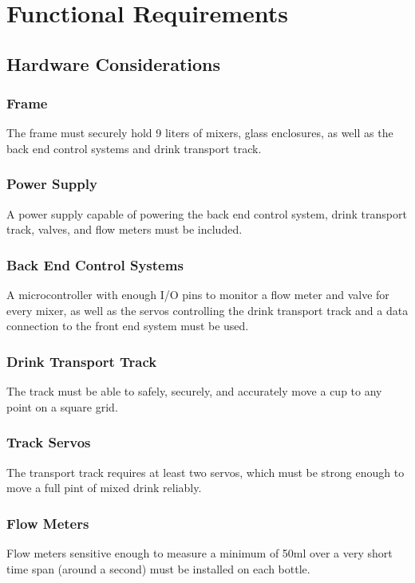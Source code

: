 
\chapter{Functional Requirements}
{
    \renewcommand*{\theenumi}{\thesubsection.\arabic{enumi}}
    \renewcommand*{\theenumii}{\theenumi.\arabic{enumii}}
    \renewcommand*{\theenumiii}{\theenumii.\arabic{enumiii}}

    \section{Hardware Considerations}
 
 	\subsection{Frame}
 		The frame must securely hold 9 liters of mixers, glass enclosures, as well as the back end control systems and drink transport track.
 		
	\subsection{Power Supply}
    A power supply capable of powering the back end control system, drink transport track, valves, and flow meters must be included.
    
	\subsection{Back End Control Systems}
    A microcontroller with enough I/O pins to monitor a flow meter and valve for every mixer, as well as the servos controlling the drink transport track and a data connection to the front end system must be used.
    
	\subsection{Drink Transport Track}
    The track must be able to safely, securely, and accurately move a cup to any point on a square grid.
    
	\subsection{Track Servos}
    The transport track requires at least two servos, which must be strong enough to move a full pint of mixed drink reliably.
    
	\subsection{Flow Meters}
    Flow meters sensitive enough to measure a minimum of 50ml over a very short time span (around a second) must be installed on each bottle.
    
}
